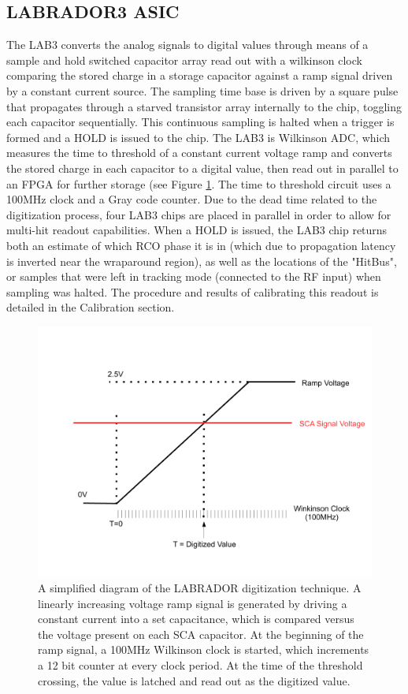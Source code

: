 	\subsection{LABRADOR3 ASIC}
	The LAB3 converts the analog signals to digital values through means of a sample and hold switched capacitor array read out with a wilkinson clock comparing the stored charge in a storage capacitor against a ramp signal driven by a constant current source.  The sampling time base is driven by a square pulse that propagates through a starved transistor array internally to the chip, toggling each capacitor sequentially.  This continuous sampling is halted when a trigger is formed and a HOLD is issued to the chip. The LAB3 is  Wilkinson ADC, which measures the time to threshold of a constant current voltage ramp and converts the stored charge in each capacitor to a digital value, then read out in parallel to an FPGA for further storage (see Figure \ref{fig:LAB_Dig}.  The time to threshold circuit uses a 100MHz clock and a Gray code counter.  Due to the dead time related to the digitization process, four LAB3 chips are placed in parallel in order to allow for multi-hit readout capabilities.  When a HOLD is issued, the LAB3 chip returns both an estimate of which RCO phase it is in (which due to propagation latency is inverted near the wraparound region), as well as the locations of the "HitBus", or samples that were left in tracking mode (connected to the RF input) when sampling was halted. The procedure and results of calibrating this readout is detailed in the Calibration section.
		

\begin{figure}
\centering
	\includegraphics[width=\textwidth]{figures/LAB3_Dig}
	\caption{A simplified diagram of the LABRADOR digitization technique.  A linearly increasing voltage ramp signal is generated by driving a constant current into a set capacitance, which is compared versus the voltage present on each SCA capacitor.  At the beginning of the ramp signal, a 100MHz Wilkinson clock is started, which increments a 12 bit counter at every clock period.  At the time of the threshold crossing, the value is latched and read out as the digitized value.}
	\label{fig:LAB_Dig}
\end{figure}

